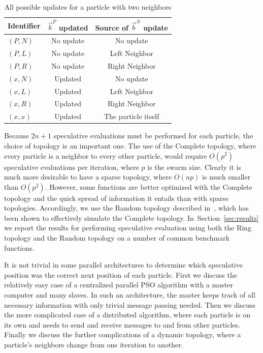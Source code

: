 \documentclass[journal,letterpaper]{IEEEtran}
\renewcommand{\sec}[1]{Section~\ref{sec:#1}}
\providecommand{\pers}{\ensuremath{P}}
\providecommand{\neigh}{\ensuremath{N}}
\providecommand{\leftind}{\ensuremath{L}}
\providecommand{\rightind}{\ensuremath{R}}
\providecommand{\nbest}{\ensuremath{\Vec{b}^\neigh}}
\providecommand{\pbest}{\ensuremath{\Vec{b}^\pers}}
\providecommand{\casexn}{\ensuremath{(x,\neigh)}}
\providecommand{\casexx}{\ensuremath{(x,x)}}
\providecommand{\casexl}{\ensuremath{(x,\leftind)}}
\providecommand{\casexr}{\ensuremath{(x,\rightind)}}
\providecommand{\casepn}{\ensuremath{(\pers,\neigh)}}
\providecommand{\casepl}{\ensuremath{(\pers,\leftind)}}
\providecommand{\casepr}{\ensuremath{(\pers,\rightind)}}
\begin{document}
\begin{table}
  \caption{All possible updates for a particle with two neighbors}
  \label{tab:evals}
  \centering
  \begin{tabular}{lcc}
	Identifier&$\pbest$ updated&Source of $\nbest$ update\\
	\hline
	\hline
	$\casepn$&No update&No update\\
	\hline
	$\casepl$&No update&Left Neighbor\\
	\hline
	$\casepr$&No update&Right Neighbor\\
	\hline
	$\casexn$&Updated&No update\\
	\hline
	$\casexl$&Updated&Left Neighbor\\
	\hline
	$\casexr$&Updated&Right Neighbor\\
	\hline
	$\casexx$&Updated&The particle itself\\
	\hline
  \end{tabular}
\end{table}

Because $2n+1$ speculative evaluations must be performed for each particle, the
choice of topology is an important one.  The use of the Complete topology,
where every particle is a neighbor to every other particle, would require
$O(p^2)$ speculative evaluations per iteration, where $p$ is the swarm size.
Clearly it is much more desirable to have a sparse topology, where $O(np)$ is
much smaller than $O(p^2)$.  However, some functions are better optimized with
the Complete topology and the quick spread of information it entails than with
sparse topologies.  Accordingly, we use the Random topology described
in~\cite{mcnabb-cec09}, which has been shown to effectively simulate the
Complete topology.  In~\sec{results} we report the results for performing
speculative evaluation using both the Ring topology and the Random topology on
a number of common benchmark functions.

It is not trivial in some parallel architectures to determine which speculative
position was the correct next position of each particle.  First we discuss the
relatively easy case of a centralized parallel PSO algorithm with a master
computer and many slaves.  In such an architecture, the master keeps track of
all necessary information with only trivial message passing needed.  Then we
discuss the more complicated case of a distributed algorithm, where each
particle is on its own and needs to send and receive messages to and from other
particles.  Finally we discuss the further complications of a dynamic topology,
where a particle's neighbors change from one iteration to another.
\end{document}
